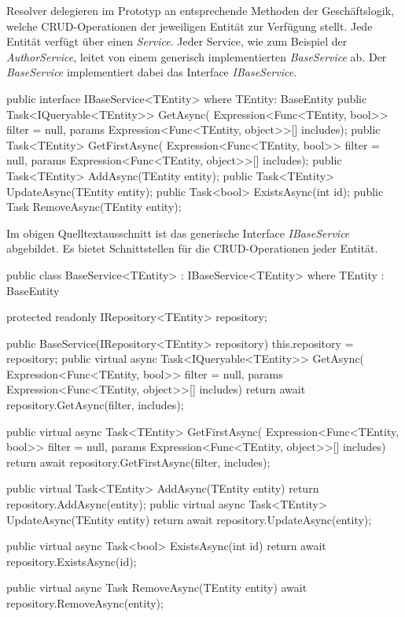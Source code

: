 Resolver delegieren im Prototyp an entsprechende Methoden der Geschäftslogik, welche CRUD-Operationen der jeweiligen Entität zur Verfügung stellt.
Jede Entität verfügt über einen \textit{Service}.
Jeder Service, wie zum Beispiel der \textit{AuthorService}, leitet von einem generisch implementierten \textit{BaseService} ab.
Der \textit{BaseService} implementiert dabei das Interface \textit{IBaseService}.
\newline

\begin{JsCode}
public interface IBaseService<TEntity> where TEntity: BaseEntity {
    public Task<IQueryable<TEntity>> GetAsync(
        Expression<Func<TEntity, bool>> filter = null,
        params Expression<Func<TEntity, object>>[] includes);
    public Task<TEntity> GetFirstAsync(
        Expression<Func<TEntity, bool>> filter = null,
        params Expression<Func<TEntity, object>>[] includes);
    public Task<TEntity> AddAsync(TEntity entity);
    public Task<TEntity> UpdateAsync(TEntity entity);
    public Task<bool> ExistsAsync(int id);
    public Task RemoveAsync(TEntity entity);
}
\end{JsCode}

Im obigen Quelltextausschnitt ist das generische Interface \textit{IBaseService} abgebildet.
Es bietet Schnittstellen für die CRUD-Operationen jeder Entität.

\begin{JsCode}
public class BaseService<TEntity> : IBaseService<TEntity> where TEntity : BaseEntity
{
    protected readonly IRepository<TEntity> repository;

    public BaseService(IRepository<TEntity> repository) {
        this.repository = repository;
    }
    public virtual async Task<IQueryable<TEntity>> GetAsync(
        Expression<Func<TEntity, bool>> filter = null,
        params Expression<Func<TEntity, object>>[] includes)
    {
        return await repository.GetAsync(filter, includes);
    }

    public virtual async Task<TEntity> GetFirstAsync(
        Expression<Func<TEntity, bool>> filter = null,
        params Expression<Func<TEntity, object>>[] includes)
    {
        return await repository.GetFirstAsync(filter, includes);
    }

    public virtual Task<TEntity> AddAsync(TEntity entity) {
        return repository.AddAsync(entity);
    }
    public virtual async Task<TEntity> UpdateAsync(TEntity entity) {
        return await repository.UpdateAsync(entity);
    }

    public virtual async Task<bool> ExistsAsync(int id) {
        return await repository.ExistsAsync(id);
    }

    public virtual async Task RemoveAsync(TEntity entity) {
        await repository.RemoveAsync(entity);
    }
}
\end{JsCode}

